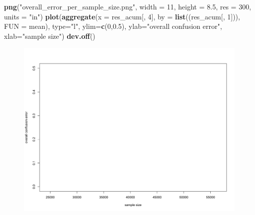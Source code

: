 \documentclass[]{book}
\newenvironment{Shaded}{\begin{snugshade}}{\end{snugshade}}
\newcommand{\KeywordTok}[1]{\textcolor[rgb]{0.13,0.29,0.53}{\textbf{{#1}}}}
\newcommand{\DataTypeTok}[1]{\textcolor[rgb]{0.13,0.29,0.53}{{#1}}}
\newcommand{\DecValTok}[1]{\textcolor[rgb]{0.00,0.00,0.81}{{#1}}}
\newcommand{\FloatTok}[1]{\textcolor[rgb]{0.00,0.00,0.81}{{#1}}}
\newcommand{\StringTok}[1]{\textcolor[rgb]{0.31,0.60,0.02}{{#1}}}
\newcommand{\NormalTok}[1]{{#1}}
\theoremstyle{definition}
\theoremstyle{definition}
\theoremstyle{definition}
\theoremstyle{remark}
\begin{document}
\begin{Shaded}
\begin{Highlighting}[]
\KeywordTok{png}\NormalTok{(}\StringTok{"overall_error_per_sample_size.png"}\NormalTok{, }\DataTypeTok{width =} \DecValTok{11}\NormalTok{, }\DataTypeTok{height =} \FloatTok{8.5}\NormalTok{, }\DataTypeTok{res =} \DecValTok{300}\NormalTok{, }\DataTypeTok{units =} \StringTok{"in"}\NormalTok{)}
\KeywordTok{plot}\NormalTok{(}\KeywordTok{aggregate}\NormalTok{(}\DataTypeTok{x =}\NormalTok{ res_acum[, }\DecValTok{4}\NormalTok{], }\DataTypeTok{by =} \KeywordTok{list}\NormalTok{((res_acum[, }\DecValTok{1}\NormalTok{])), }\DataTypeTok{FUN =}\NormalTok{ mean), }\DataTypeTok{type=}\StringTok{"l"}\NormalTok{, }\DataTypeTok{ylim=}\KeywordTok{c}\NormalTok{(}\DecValTok{0}\NormalTok{,}\FloatTok{0.5}\NormalTok{), }\DataTypeTok{ylab=}\StringTok{"overall confusion error"}\NormalTok{, }\DataTypeTok{xlab=}\StringTok{"sample size"}\NormalTok{)}
\KeywordTok{dev.off}\NormalTok{()}
\end{Highlighting}
\end{Shaded}

\begin{figure}
\centering
\includegraphics{overall_error_per_sample_size.png}
\caption{}
\end{figure}
\end{document}
